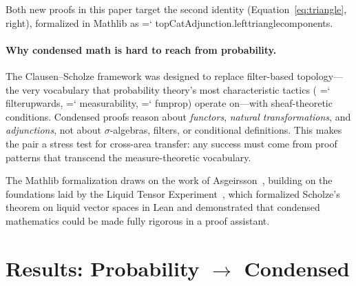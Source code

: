 \documentclass[11pt]{article}
\renewcommand{\texttt}[1]{%
  \begingroup\ttfamily\hyphenchar\font=`\-\relax
  \def\_{\textunderscore\discretionary{}{}{}}%
  #1\endgroup}
\theoremstyle{definition}
\theoremstyle{remark}
\begin{document}
Both new proofs in this paper target the second identity
(Equation~\ref{eq:triangle}, right), formalized in Mathlib as
\texttt{topCatAdjunction.left\_triangle\_components}.

\paragraph{Why condensed math is hard to reach from probability.}
The Clausen--Scholze framework was designed to replace filter-based
topology---the very vocabulary that probability theory's most
characteristic tactics (\texttt{filter\_upwards},
\texttt{measurability}, \texttt{fun\_prop}) operate on---with
sheaf-theoretic conditions.  Condensed proofs reason about
\emph{functors}, \emph{natural transformations}, and
\emph{adjunctions}, not about $\sigma$-algebras, filters, or
conditional definitions.  This makes the pair a stress test for
cross-area transfer: any success must come from proof patterns
that transcend the measure-theoretic vocabulary.

The Mathlib formalization draws on the work of
Asgeirsson~\cite{asgeirsson_condensed_2024, asgeirsson_discrete_2024},
building on the foundations laid by the Liquid Tensor
Experiment~\cite{scholze_liquid_2020, commelin_lte_2022}, which
formalized Scholze's theorem on liquid vector spaces in Lean and
demonstrated that condensed mathematics could be made fully
rigorous in a proof assistant.

\section{Results: Probability $\to$ Condensed}\label{sec:results}
\end{document}
